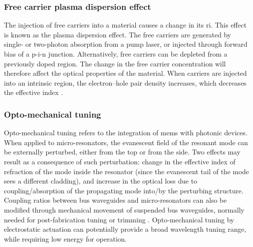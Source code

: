 \documentclass[../report.tex]{subfiles}
\begin{document}
\subsubsection{Free carrier plasma dispersion effect} The injection of free carriers into a material causes a change in its \gls{ri}. This effect is known as the plasma dispersion effect. The free carriers are generated by single- or two-photon absorption from a pump laser, or injected through forward bias of a p-i-n junction. Alternatively, free carriers can be depleted from a previously doped region. The change in the free carrier concentration will therefore affect the optical properties of the material. When carriers are injected into an intrinsic region, the electron–hole pair density increases, which decreases the effective index \cite{soref_electrooptical_1987}.

\subsubsection{Opto-mechanical tuning} Opto-mechanical tuning refers to the integration of \gls{mems} with photonic devices. When applied to micro-resonators, the evanescent field of the resonant mode can be externally perturbed, either from the top or from the side. Two effects may result as a consequence of such perturbation: change in the effective index of refraction of the mode inside the resonator (since the evanescent tail of the mode sees a different cladding), and increase in the optical
loss due to coupling/absorption of the propagating mode into/by the perturbing structure. Coupling ratios between bus waveguides and micro-resonators can also be modified through mechanical movement of suspended bus waveguides, normally needed for post-fabrication tuning or trimming \cite{elfadel_3d_2016}. Opto-mechanical tuning by electrostatic actuation can potentially provide a broad wavelength tuning range, while requiring low energy for operation.
\end{document}

